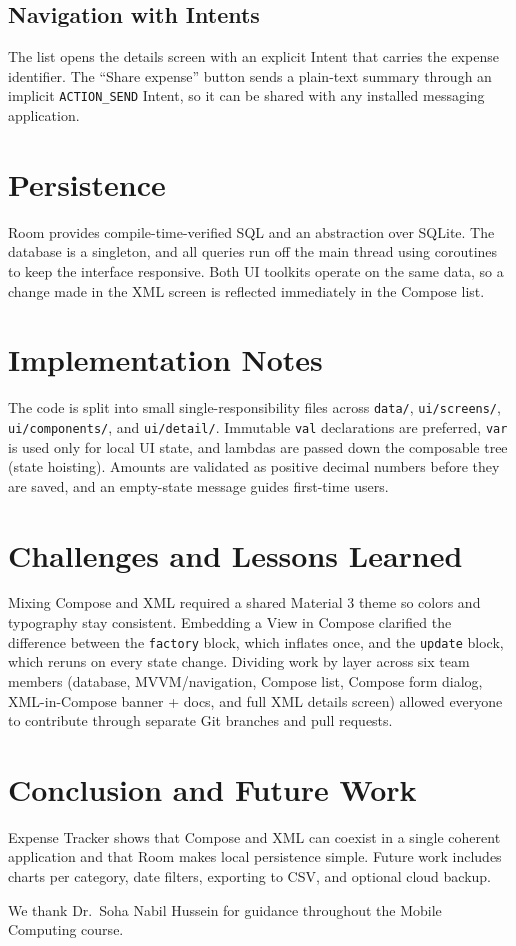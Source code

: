 \documentclass[sigconf,nonacm]{acmart}
\begin{document}
\subsection{Navigation with Intents}
The list opens the details screen with an explicit Intent that carries the expense identifier.
The ``Share expense'' button sends a plain-text summary through an implicit \texttt{ACTION\_SEND}
Intent, so it can be shared with any installed messaging application.

\section{Persistence}
Room provides compile-time-verified SQL and an abstraction over SQLite. The database is a
singleton, and all queries run off the main thread using coroutines to keep the interface
responsive. Both UI toolkits operate on the same data, so a change made in the XML screen is
reflected immediately in the Compose list.

\section{Implementation Notes}
The code is split into small single-responsibility files across \texttt{data/},
\texttt{ui/screens/}, \texttt{ui/components/}, and \texttt{ui/detail/}. Immutable \texttt{val}
declarations are preferred, \texttt{var} is used only for local UI state, and lambdas are passed
down the composable tree (state hoisting). Amounts are validated as positive decimal numbers
before they are saved, and an empty-state message guides first-time users.

\section{Challenges and Lessons Learned}
Mixing Compose and XML required a shared Material 3 theme so colors and typography stay
consistent. Embedding a View in Compose clarified the difference between the \texttt{factory}
block, which inflates once, and the \texttt{update} block, which reruns on every state change.
Dividing work by layer across six team members (database, MVVM/navigation, Compose list, Compose
form dialog, XML-in-Compose banner + docs, and full XML details screen) allowed everyone to
contribute through separate Git branches and pull requests.

\section{Conclusion and Future Work}
Expense Tracker shows that Compose and XML can coexist in a single coherent application and that
Room makes local persistence simple. Future work includes charts per category, date filters,
exporting to CSV, and optional cloud backup.

\begin{acks}
We thank Dr.\ Soha Nabil Hussein for guidance throughout the Mobile Computing course.
\end{acks}
\end{document}
